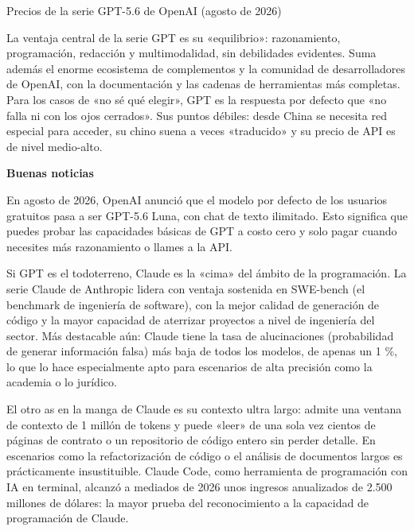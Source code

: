 \begin{center}\small\color{gray}Precios de la serie GPT-5.6 de OpenAI (agosto de 2026)\end{center}

La ventaja central de la serie GPT es su «equilibrio»: razonamiento, programación, redacción y multimodalidad, sin debilidades evidentes. Suma además el enorme ecosistema de complementos y la comunidad de desarrolladores de OpenAI, con la documentación y las cadenas de herramientas más completas. Para los casos de «no sé qué elegir», GPT es la respuesta por defecto que «no falla ni con los ojos cerrados». Sus puntos débiles: desde China se necesita red especial para acceder, su chino suena a veces «traducido» y su precio de API es de nivel medio-alto.

\textbf{Buenas noticias}\par

En agosto de 2026, OpenAI anunció que el modelo por defecto de los usuarios gratuitos pasa a ser GPT-5.6 Luna, con chat de texto ilimitado. Esto significa que puedes probar las capacidades básicas de GPT a costo cero y solo pagar cuando necesites más razonamiento o llames a la API.


Si GPT es el todoterreno, Claude es la «cima» del ámbito de la programación. La serie Claude de Anthropic lidera con ventaja sostenida en SWE-bench (el benchmark de ingeniería de software), con la mejor calidad de generación de código y la mayor capacidad de aterrizar proyectos a nivel de ingeniería del sector. Más destacable aún: Claude tiene la tasa de alucinaciones (probabilidad de generar información falsa) más baja de todos los modelos, de apenas un 1 \%, lo que lo hace especialmente apto para escenarios de alta precisión como la academia o lo jurídico.

El otro as en la manga de Claude es su contexto ultra largo: admite una ventana de contexto de 1 millón de tokens y puede «leer» de una sola vez cientos de páginas de contrato o un repositorio de código entero sin perder detalle. En escenarios como la refactorización de código o el análisis de documentos largos es prácticamente insustituible. Claude Code, como herramienta de programación con IA en terminal, alcanzó a mediados de 2026 unos ingresos anualizados de 2.500 millones de dólares: la mayor prueba del reconocimiento a la capacidad de programación de Claude.

